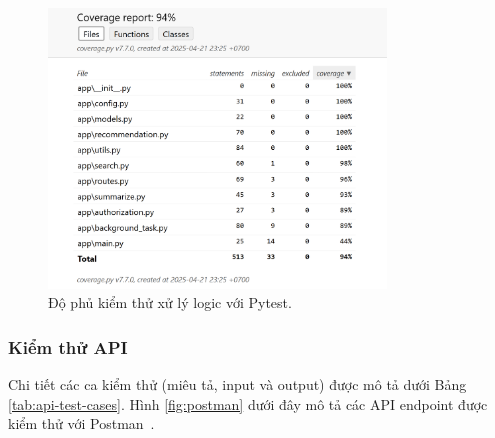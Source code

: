 \begin{figure}[H]
    \centering  
    \includegraphics[width=0.8\textwidth]{figures/c4/unittest.png}
    \caption{Độ phủ kiểm thử xử lý logic với Pytest.}
    \label{fig:pytest-testing}
\end{figure}


\subsubsection{Kiểm thử API}

Chi tiết các ca kiểm thử (miêu tả, input và output) được mô tả dưới Bảng \ref{tab:api-test-cases}. Hình \ref{fig:postman} dưới đây mô tả các API endpoint được kiểm thử với Postman~\cite{postman}.  

